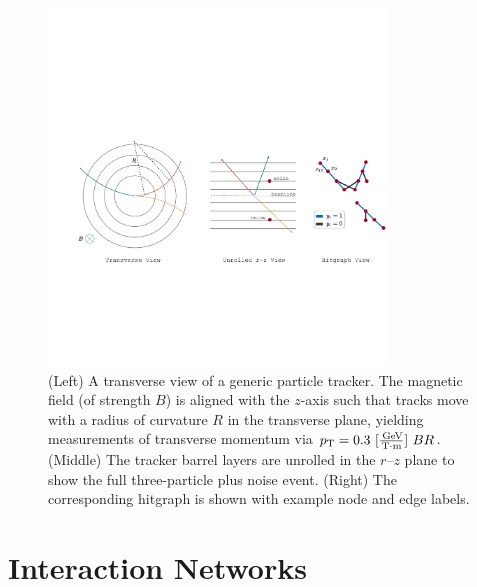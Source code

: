 \documentclass[twocolumn]{svjour3}
\newcommand{\pt}{\ensuremath{p_{\mathrm{T}}}\xspace}
\newcommand{\GeV}{\ensuremath{\,\text{Ge\hspace{-.08em}V}}\xspace}
\begin{document}
\begin{figure}[!htbp]
\centering
\captionsetup{labelfont=bf}
\includegraphics[width=0.8\textwidth,clip]{tracking_diagram.pdf}
\caption{(Left) A transverse view of a generic particle tracker. 
The magnetic field (of strength $B$) is aligned with the $z$-axis such that tracks move with a radius of curvature $R$ in the transverse plane, yielding measurements of transverse momentum via $\pt=0.3\ [\frac{\GeV}{\text{T}\cdot\text{m}}]\ BR$. 
(Middle) The tracker barrel layers are unrolled in the $r$--$z$ plane to show the full three-particle plus noise event. 
(Right) The corresponding hitgraph is shown with example node and edge labels. }
\label{fig:tracking} 
\end{figure}
 

\section{Interaction Networks}
\label{sec:IN}
\end{document}
